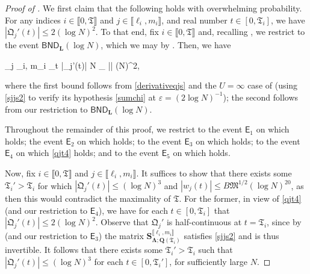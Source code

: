 \documentclass{amsart}
\numberwithin{equation}{section}
\theoremstyle{remark}
\theoremstyle{definition}
\begin{document}
 		
 		\begin{proof}[Proof of ]
 			
 			We first claim that the following holds with overwhelming probability. For any indices $i \in \llbracket 0, \mathfrak{T}  \rrbracket$ and $j \in \llbracket \ell_i, m_i \rrbracket$, and real number $t \in [0, \mathfrak{T}_i]$, we have $|\mathfrak{Q}_j'(t)| \le 2 (\log N)^2$. To that end, fix $i \in \llbracket 0, \mathfrak{T}  \rrbracket$ and, recalling , we restrict to the event $\mathsf{BND}_{\bm{L}} (\log N)$, which we may by . Then, we have 
 			\begin{flalign}
 				\label{qjt4} 
 				\displaystyle\max_{j \in \llbracket \ell_i, m_i \rrbracket} \displaystyle\sup_{t \in [0, i]} |_j'(t)|  \log N \cdot \displaystyle\max_{\Lambda \in \bm{\Lambda}} |\Lambda|  (\log N)^2,
 			\end{flalign}
 			
 			\noindent where the first bound follows from \eqref{derivativeqjs} and the $U = \infty$ case of  (using \eqref{sjjs2} to verify its hypothesis \eqref{sumchi} at $\varepsilon = (2 \log N)^{-1}$); the second follows from our restriction to $\mathsf{BND}_{\bm{L}} (\log N)$.

 		Throughout the remainder of this proof, we restrict to the event $\mathsf{E}_1$ on which  holds; the event $\mathsf{E}_2$ on which  holds; to the event $\mathsf{E}_3$ on which  holds; to the event $\mathsf{E}_4$ on which \eqref{qjt4} holds; and to the event $\mathsf{E}_5$ on which  holds. 
 		
 		Now, fix $i \in \llbracket 0, \mathfrak{T}  \rrbracket$ and $j \in \llbracket \ell_i, m_i \rrbracket$. It suffices to show that there exists some $\mathfrak{T}_i' > \mathfrak{T}_i$ for which $|\mathfrak{Q}_j'(t)| \le (\log N)^3$ and $|w_j (t)| \le B \mathfrak{M}^{1/2} (\log N)^{20}$, as then this would contradict the maximality of $\mathfrak{T}$. For the former, in view of \eqref{qjt4} (and our restriction to $\mathsf{E}_4$), we have for each $t \in [0, \mathfrak{T}_i]$ that $|\mathfrak{Q}_j' (t)| \le 2 (\log N)^2$. Observe that $\mathfrak{Q}_j'$ is half-continuous at $t = \mathfrak{T}_i$, since by  (and our restriction to $\mathsf{E}_3$) the matrix $\bm{S}_{\bm{\Lambda}; \bm{Q}(\mathfrak{T}_i)}^{\llbracket \ell_i, m_i \rrbracket}$ satisfies \eqref{sjjs2} and is thus invertible. It follows that there exists some $\mathfrak{T}_i' > \mathfrak{T}_i$ such that $|\mathfrak{Q}_j' (t)| \le (\log N)^3$ for each $t \in [0, \mathfrak{T}_i']$, for sufficiently large $N$.
 		

\end{proof}
\end{document}
